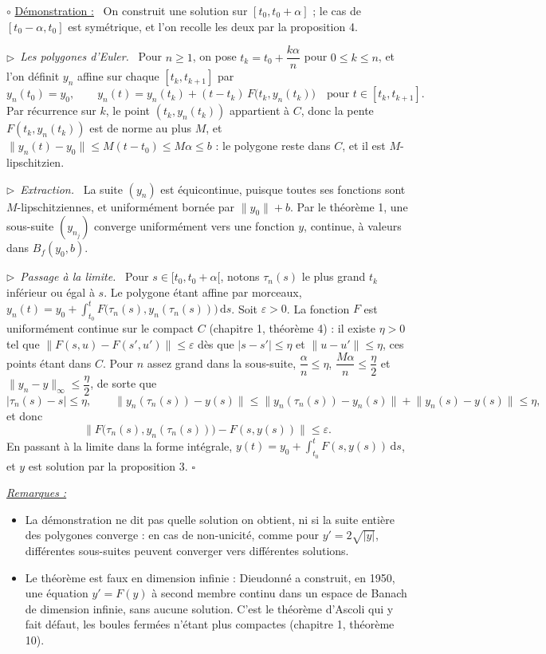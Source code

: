 \documentclass[a4paper,twoside]{report}
\newenvironment{demo}%
 {\par\needspace{4\baselineskip}\vspace{1mm}\noindent$\circ$ \underline{Démonstration :}~\setlength{\parskip}{3pt plus 1pt}}%
 {\hfill$\square$\par\vspace{2mm}}
\newcommand{\etape}[1]{\par\smallskip\noindent$\triangleright$~\textit{#1}~}
\newenvironment{remarques}%
 {\par\needspace{6\baselineskip}\vspace{1mm}\begin{list}{}{\leftmargin=1cm \rightmargin=0.5cm}\item[]%
  \textit{\underline{Remarques :}}%
  \begin{itemize}[label=$\bullet$,leftmargin=0.45cm,topsep=3pt,itemsep=4pt]}%
 {\end{itemize}\end{list}\vspace{1mm}}
\newcommand{\dd}{\mathrm{d}}                      %
\newcommand{\norme}[1]{\lVert #1 \rVert}         %
\newcommand{\Bf}{B_{f}}                           %
\begin{document}
\begin{demo}
On construit une solution sur $[t_{0}, t_{0} + \alpha]$ ; le cas de $[t_{0} - \alpha, t_{0}]$ est symétrique, et l'on recolle les deux par la proposition 4.

\etape{Les polygones d'Euler.} Pour $n \geqslant 1$, on pose $t_{k} = t_{0} + \dfrac{k\alpha}{n}$ pour $0 \leqslant k \leqslant n$, et l'on définit $y_{n}$ affine sur chaque $[t_{k}, t_{k + 1}]$ par
\[ y_{n}(t_{0}) = y_{0}, \qquad y_{n}(t) = y_{n}(t_{k}) + (t - t_{k})\,F\big(t_{k}, y_{n}(t_{k})\big) \quad \text{pour } t \in [t_{k}, t_{k + 1}]. \]
Par récurrence sur $k$, le point $(t_{k}, y_{n}(t_{k}))$ appartient à $C$, donc la pente $F(t_{k}, y_{n}(t_{k}))$ est de norme au plus $M$, et $\norme{y_{n}(t) - y_{0}} \leqslant M(t - t_{0}) \leqslant M\alpha \leqslant b$ : le polygone reste dans $C$, et il est $M$-lipschitzien.

\etape{Extraction.} La suite $(y_{n})$ est équicontinue, puisque toutes ses fonctions sont $M$-lipschitziennes, et uniformément bornée par $\norme{y_{0}} + b$. Par le théorème 1, une sous-suite $(y_{n_{j}})$ converge uniformément vers une fonction $y$, continue, à valeurs dans $\Bf(y_{0}, b)$.

\etape{Passage à la limite.} Pour $s \in [t_{0}, t_{0} + \alpha[$, notons $\tau_{n}(s)$ le plus grand $t_{k}$ inférieur ou égal à $s$. Le polygone étant affine par morceaux, $y_{n}(t) = y_{0} + \displaystyle\int_{t_{0}}^{t} F\big(\tau_{n}(s), y_{n}(\tau_{n}(s))\big)\,\dd s$. Soit $\varepsilon > 0$. La fonction $F$ est uniformément continue sur le compact $C$ (chapitre 1, théorème 4) : il existe $\eta > 0$ tel que $\norme{F(s, u) - F(s', u')} \leqslant \varepsilon$ dès que $|s - s'| \leqslant \eta$ et $\norme{u - u'} \leqslant \eta$, ces points étant dans $C$. Pour $n$ assez grand dans la sous-suite, $\dfrac{\alpha}{n} \leqslant \eta$, $\dfrac{M\alpha}{n} \leqslant \dfrac{\eta}{2}$ et $\norme{y_{n} - y}_{\infty} \leqslant \dfrac{\eta}{2}$, de sorte que
\[ |\tau_{n}(s) - s| \leqslant \eta, \qquad \norme{y_{n}(\tau_{n}(s)) - y(s)} \leqslant \norme{y_{n}(\tau_{n}(s)) - y_{n}(s)} + \norme{y_{n}(s) - y(s)} \leqslant \eta, \]
et donc
\[ \norme{F\big(\tau_{n}(s), y_{n}(\tau_{n}(s))\big) - F(s, y(s))} \leqslant \varepsilon. \]
En passant à la limite dans la forme intégrale, $y(t) = y_{0} + \displaystyle\int_{t_{0}}^{t} F(s, y(s))\,\dd s$, et $y$ est solution par la proposition 3.
\end{demo}

\begin{remarques}
  \item La démonstration ne dit pas quelle solution on obtient, ni si la suite entière des polygones converge : en cas de non-unicité, comme pour $y' = 2\sqrt{|y|}$, différentes sous-suites peuvent converger vers différentes solutions.
  \item Le théorème est faux en dimension infinie : Dieudonné a construit, en 1950, une équation $y' = F(y)$ à second membre continu dans un espace de Banach de dimension infinie, sans aucune solution. C'est le théorème d'Ascoli qui y fait défaut, les boules fermées n'étant plus compactes (chapitre 1, théorème 10).
\end{remarques}
\end{document}
